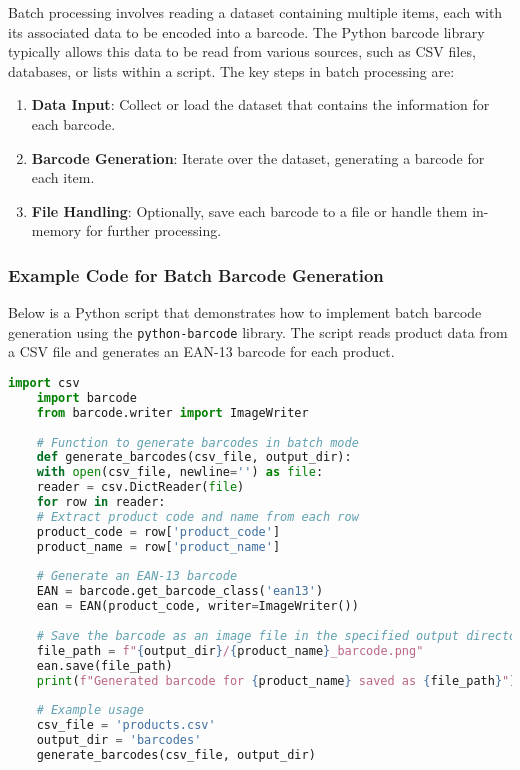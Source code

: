 Batch processing involves reading a dataset containing multiple items, each with its associated data to be encoded into a barcode. The Python barcode library typically allows this data to be read from various sources, such as CSV files, databases, or lists within a script. The key steps in batch processing are:

\begin{enumerate}
	\item \textbf{Data Input}: Collect or load the dataset that contains the information for each barcode.
	\item \textbf{Barcode Generation}: Iterate over the dataset, generating a barcode for each item.
	\item \textbf{File Handling}: Optionally, save each barcode to a file or handle them in-memory for further processing.
\end{enumerate}

\subsubsection{Example Code for Batch Barcode Generation}

Below is a Python script that demonstrates how to implement batch barcode generation using the \texttt{python-barcode} library. The script reads product data from a CSV file and generates an EAN-13 barcode for each product.

\begin{lstlisting}[language=Python]
	import csv
	import barcode
	from barcode.writer import ImageWriter
	
	# Function to generate barcodes in batch mode
	def generate_barcodes(csv_file, output_dir):
	with open(csv_file, newline='') as file:
	reader = csv.DictReader(file)
	for row in reader:
	# Extract product code and name from each row
	product_code = row['product_code']
	product_name = row['product_name']
	
	# Generate an EAN-13 barcode
	EAN = barcode.get_barcode_class('ean13')
	ean = EAN(product_code, writer=ImageWriter())
	
	# Save the barcode as an image file in the specified output directory
	file_path = f"{output_dir}/{product_name}_barcode.png"
	ean.save(file_path)
	print(f"Generated barcode for {product_name} saved as {file_path}")
	
	# Example usage
	csv_file = 'products.csv'
	output_dir = 'barcodes'
	generate_barcodes(csv_file, output_dir)
\end{lstlisting}



